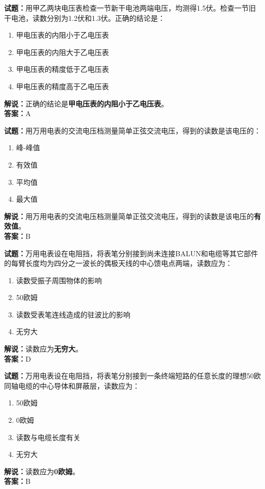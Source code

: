 \documentclass{ctexbook}
\begin{document}
\vspace{1em}

\textbf{试题：}用甲乙两块电压表检查一节新干电池两端电压，均测得1.5伏。检查一节旧干电池，读数分别为1.2伏和1.3伏。正确的结论是：
\begin{enumerate}[leftmargin=3em]
  \item 甲电压表的内阻小于乙电压表
  \item 甲电压表的内阻大于乙电压表
  \item 甲电压表的精度低于乙电压表
  \item 甲电压表的精度高于乙电压表
\end{enumerate}
\noindent\textbf{解说：}正确的结论是\textbf{甲电压表的内阻小于乙电压表}。\\\noindent\textbf{答案：}A

\vspace{1em}

\textbf{试题：}用万用电表的交流电压档测量简单正弦交流电压，得到的读数是该电压的：
\begin{enumerate}[leftmargin=3em]
  \item 峰-峰值
  \item 有效值
  \item 平均值
  \item 最大值
\end{enumerate}
\noindent\textbf{解说：}用万用电表的交流电压档测量简单正弦交流电压，得到的读数是该电压的\textbf{有效值}。\\\noindent\textbf{答案：}B

\vspace{1em}

\textbf{试题：}万用电表设在电阻挡，将表笔分别接到尚未连接BALUN和电缆等其它部件的每臂长度均为四分之一波长的偶极天线的中心馈电点两端，读数应为：
\begin{enumerate}[leftmargin=3em]
  \item 读数受振子周围物体的影响
  \item 50欧姆
  \item 读数受表笔连线造成的驻波比的影响
  \item 无穷大
\end{enumerate}
\noindent\textbf{解说：}读数应为\textbf{无穷大}。\\\noindent\textbf{答案：}D

\vspace{1em}

\textbf{试题：}万用电表设在电阻挡，将表笔分别接到一条终端短路的任意长度的理想50欧同轴电缆的中心导体和屏蔽层，读数应为：
\begin{enumerate}[leftmargin=3em]
  \item 50欧姆
  \item 0欧姆
  \item 读数与电缆长度有关
  \item 无穷大
\end{enumerate}
\noindent\textbf{解说：}读数应为\textbf{0欧姆}。\\\noindent\textbf{答案：}B
\end{document}

